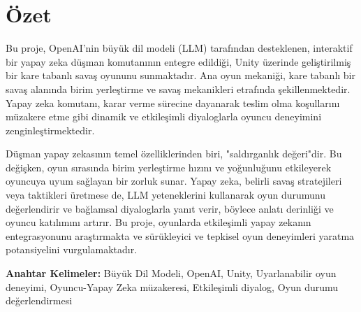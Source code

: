 \chapter*{Özet}

Bu proje, OpenAI'nin büyük dil modeli (LLM) tarafından desteklenen, interaktif bir yapay zeka düşman komutanının entegre edildiği, Unity üzerinde geliştirilmiş bir kare tabanlı savaş oyununu sunmaktadır. Ana oyun mekaniği, kare tabanlı bir savaş alanında birim yerleştirme ve savaş mekanikleri etrafında şekillenmektedir. Yapay zeka komutanı, karar verme sürecine dayanarak teslim olma koşullarını müzakere etme gibi dinamik ve etkileşimli diyaloglarla oyuncu deneyimini zenginleştirmektedir.

Düşman yapay zekasının temel özelliklerinden biri, "saldırganlık değeri"dir. Bu değişken, oyun sırasında birim yerleştirme hızını ve yoğunluğunu etkileyerek oyuncuya uyum sağlayan bir zorluk sunar. Yapay zeka, belirli savaş stratejileri veya taktikleri üretmese de, LLM yeteneklerini kullanarak oyun durumunu değerlendirir ve bağlamsal diyaloglarla yanıt verir, böylece anlatı derinliği ve oyuncu katılımını artırır. Bu proje, oyunlarda etkileşimli yapay zekanın entegrasyonunu araştırmakta ve sürükleyici ve tepkisel oyun deneyimleri yaratma potansiyelini vurgulamaktadır.

\vfill
\sloppy
\textbf{Anahtar Kelimeler:} Büyük Dil Modeli, OpenAI, Unity, Uyarlanabilir oyun deneyimi, 
Oyuncu-Yapay Zeka müzakeresi, Etkileşimli diyalog, Oyun durumu değerlendirmesi
\clearpage
